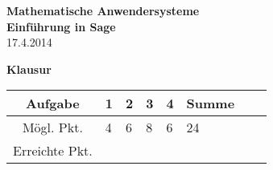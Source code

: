 \usepackage[svgnames]{xcolor} %



\parindent0cm 




\begin{center}
\textbf{\LARGE Mathematische Anwendersysteme }\\
\textbf{\LARGE Einführung in Sage}\\
\medskip
17.4.2014
\end{center}

\begin{center}
\Huge \textbf{Klausur}
\end{center}
\bigskip\bigskip\bigskip
\Large
\begin{center}
\begin{tabular}{|Sl||p{0.5cm}|p{0.5cm}|p{0.5cm}|p{0.5cm}|Sc|}
\hline
Aufgabe & \textbf{1} & \textbf{2} & \textbf{3} & \textbf{4} &  \textbf{Summe}\\
\hline
Mögl. Pkt. &  4  & 6  & 8  & 6     &  24  \\
\hline
Erreichte Pkt. &    &   &   &   &    \\
\hline
\end{tabular}
\end{center}

